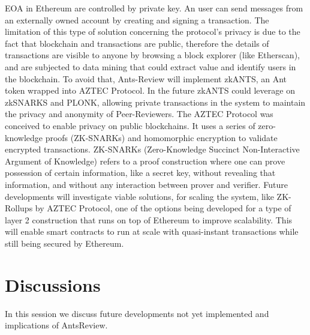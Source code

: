 \documentclass[runningheads]{llncs}
\begin{document}
EOA in Ethereum are controlled by private key. An user can send messages from an externally owned account by creating and signing a transaction. The limitation of this type of solution concerning the protocol's privacy is due to the fact that blockchain and transactions are public, therefore the details of transactions are visible to anyone by browsing a block explorer (like Etherscan), and are subjected to data mining that could extract value and identify users in the blockchain.
\newline To avoid that, Ants-Review will implement zkANTS, an Ant token wrapped into AZTEC Protocol. In the future zkANTS could leverage on zkSNARKS and PLONK, allowing private transactions in the system to maintain the privacy and anonymity of Peer-Reviewers.
\newline The AZTEC Protocol was conceived to enable privacy on public blockchains. It uses a series of zero-knowledge proofs (ZK-SNARKs) and homomorphic encryption to validate encrypted transactions.
\newline ZK-SNARKs (Zero-Knowledge Succinct Non-Interactive Argument of Knowledge) \cite{ZKSNARKs} refers to a proof construction where one can prove possession of certain information, like a secret key, without revealing that information, and without any interaction between prover and verifier.
\newline Future developments will investigate viable solutions, for scaling the system, like ZK-Rollups by AZTEC Protocol, one of the options being developed for a type of layer 2 construction that runs on top of Ethereum to improve scalability. This will enable smart contracts to run  at scale with quasi-instant transactions while still being secured by Ethereum.

\section{Discussions}
In this session we discuss future developments not yet implemented and implications of AntsReview.
\end{document}
